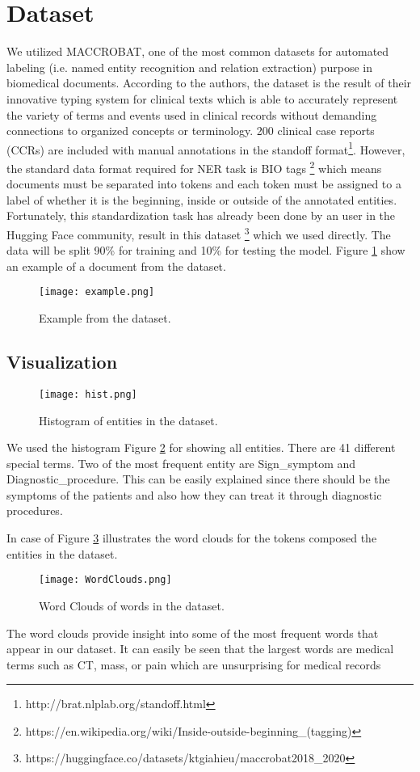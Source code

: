 \documentclass[conference]{IEEEtran}
\begin{document}
\section{Dataset} \label{section3}
We utilized MACCROBAT\cite{Caufield2019}, one of the most common datasets for automated
labeling (i.e. named entity recognition and relation extraction) purpose in biomedical
documents. According to the authors, the dataset is the result of their innovative typing system
for clinical texts which is able to accurately represent the variety of terms and events used
in clinical records without demanding connections to organized concepts or terminology.
200 clinical case reports (CCRs) are included with manual annotations in the standoff
format\footnote{http://brat.nlplab.org/standoff.html}. However, the standard data format required
for NER task is BIO tags \footnote{https://en.wikipedia.org/wiki/Inside-outside-beginning\_(tagging)}
which means documents must be separated into tokens and each token must be assigned to a
label of whether it is the beginning, inside or outside of the annotated entities. 
Fortunately, this standardization task has already been done by an user in the Hugging Face
community, result in this dataset \footnote{https://huggingface.co/datasets/ktgiahieu/maccrobat2018\_2020}
which we used directly. The data will be split 90\% for training and 10\% for testing
the model. Figure \ref{fig2} show an example of a document from the dataset. 
\begin{figure}[h]
    \texttt{[image: example.png]}
    \caption{Example from the dataset.}
    \label{fig2}
\end{figure}

\subsection{Visualization}
\begin{figure}[h]
    \centering
    \texttt{[image: hist.png]}
    \caption{Histogram of entities in the dataset.}
    \label{fig3}
\end{figure}
We used the histogram Figure \ref{fig3} for showing all entities. There are 41 different
special terms. Two of the most frequent entity are Sign\_symptom and 
Diagnostic\_procedure. This can be easily explained since there should be the symptoms of
the patients and also how they can treat it through diagnostic procedures.  


In case of Figure \ref{fig4} illustrates the word clouds for the tokens composed the
entities in the dataset.
\begin{figure}[h]
    \centering
    \texttt{[image: WordClouds.png]}
    \caption{Word Clouds of words in the dataset.}
    \label{fig4}
\end{figure}
The word clouds provide insight into some of the most frequent words that appear in our dataset. 
It can easily be seen that the largest words are medical terms such as CT, mass, or pain which
are unsurprising for medical records
\end{document}
